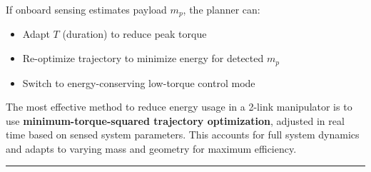 \documentclass[a4paper,12pt]{article}
\begin{document}
If onboard sensing estimates payload $m_p$, the planner can:
\begin{itemize}
    \item Adapt $T$ (duration) to reduce peak torque
    \item Re-optimize trajectory to minimize energy for detected $m_p$
    \item Switch to energy-conserving low-torque control mode
\end{itemize}

The most effective method to reduce energy usage in a 2-link manipulator is to use \textbf{minimum-torque-squared trajectory optimization}, adjusted in real time based on sensed system parameters. This accounts for full system dynamics and adapts to varying mass and geometry for maximum efficiency.

\vspace{1em}
\noindent\rule{\linewidth}{0.6pt}
\vspace{1em}
\end{document}
